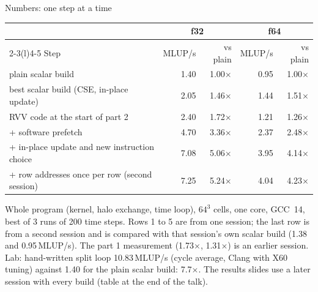 \documentclass[aspectratio=169,10pt,t]{beamer}
\newcommand{\sx}[1]{#1\ensuremath{\times}} %
\begin{document}
\begin{frame}{Numbers: one step at a time}
  \vspace{1mm}
  \centering
  {\small
  \begin{tabular}{@{}lrrrr@{}}
    \toprule
    & \multicolumn{2}{c}{\textbf{f32}} & \multicolumn{2}{c}{\textbf{f64}}\\
    \cmidrule(lr){2-3}\cmidrule(l){4-5}
    Step & MLUP/s & vs plain & MLUP/s & vs plain\\
    \midrule
    plain scalar build & 1.40 & \sx{1.00} & 0.95 & \sx{1.00}\\
    best scalar build (CSE, in-place update) & 2.05 & \sx{1.46} & 1.44 & \sx{1.51}\\
    RVV code at the start of part 2 & 2.40 & \sx{1.72} & 1.21 & \sx{1.26}\\
    + software prefetch & 4.70 & \sx{3.36} & 2.37 & \sx{2.48}\\
    + in-place update and new instruction choice & 7.08 & \sx{5.06} & 3.95 & \sx{4.14}\\
    + row addresses once per row (second session) & 7.25 & \sx{5.24} & 4.04 & \sx{4.23}\\
    \bottomrule
  \end{tabular}\par}

  \vspace{3mm}
  \raggedright
  {\scriptsize\color{psgray}
  Whole program (kernel, halo exchange, time loop), $64^3$ cells, one core, GCC~14, best of 3
  runs of 200 time steps. Rows 1 to 5 are from one session; the last row is from a second
  session and is compared with that session's own scalar build (1.38 and 0.95\,MLUP/s). The
  part 1 measurement (\sx{1.73}, \sx{1.31}) is an earlier session. Lab: hand-written split loop
  10.83\,MLUP/s (cycle average, Clang with X60 tuning) against 1.40 for the plain scalar build:
  \sx{7.7}. The results slides use a later session with every build (table at the end of the talk).\par}
\end{frame}
\end{document}
